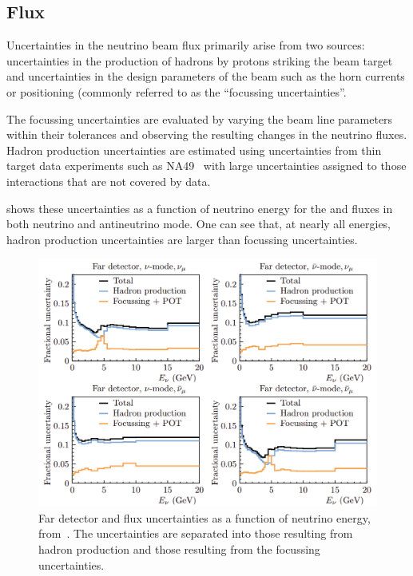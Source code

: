 \subsection{Flux}
\label{sec:dune_lbl:systs:flux}

Uncertainties in the neutrino beam flux primarily arise from two sources: uncertainties in the production of hadrons by protons striking the beam target and uncertainties in the design parameters of the beam such as the horn currents or positioning (commonly referred to as the ``focussing uncertainties''.

The focussing uncertainties are evaluated by varying the beam line parameters within their tolerances and observing the resulting changes in the neutrino fluxes.
Hadron production uncertainties are estimated using uncertainties from thin target data experiments such as NA49~\cite{na49} with large uncertainties assigned to those interactions that are not covered by data.

 shows these uncertainties as a function of neutrino energy for the \numu and \anumu fluxes in both neutrino and antineutrino mode.
One can see that, at nearly all energies, hadron production uncertainties are larger than focussing uncertainties.

\begin{figure}[h]
  \centering
  \includegraphics[width=.8\linewidth]{files/figures/dune_detector/fluxUncertainties}
  \caption[Far detector flux uncertainties for \numu and \anumu]{Far detector \numu and \anumu flux uncertainties as a function of neutrino energy, from~\cite{tdrVol2}. The uncertainties are separated into those resulting from hadron production and those resulting from the focussing uncertainties.}
  \label{fig:fluxUncertainties}
\end{figure}

